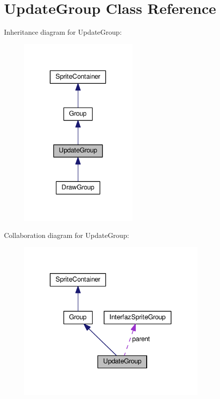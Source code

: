 \hypertarget{class_update_group}{}\section{Update\+Group Class Reference}
\label{class_update_group}


Inheritance diagram for Update\+Group\+:\nopagebreak
\begin{figure}[H]
\begin{center}
\leavevmode
\includegraphics[width=164pt]{class_update_group__inherit__graph}
\end{center}
\end{figure}


Collaboration diagram for Update\+Group\+:\nopagebreak
\begin{figure}[H]
\begin{center}
\leavevmode
\includegraphics[width=263pt]{class_update_group__coll__graph}
\end{center}
\end{figure}
